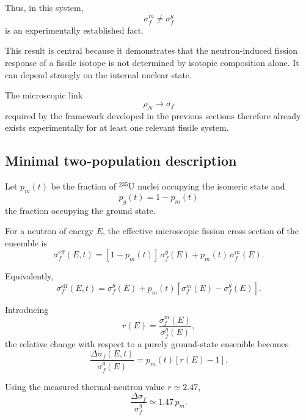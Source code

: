 Thus, in this system,
\begin{equation}
\boxed{\sigma_f^m \neq \sigma_f^g}
\end{equation}
is an experimentally established fact.

This result is central because it demonstrates that the neutron-induced fission response of a fissile isotope is not determined by isotopic composition alone. It can depend strongly on the internal nuclear state.

The microscopic link
\begin{equation}
\rho_N \longrightarrow \sigma_f
\end{equation}
required by the framework developed in the previous sections therefore already exists experimentally for at least one relevant fissile system.

\subsection{Minimal two-population description}

Let $p_m(t)$ be the fraction of $^{235}\mathrm{U}$ nuclei occupying the isomeric state and
\begin{equation}
p_g(t)=1-p_m(t)
\end{equation}
the fraction occupying the ground state.

For a neutron of energy $E$, the effective microscopic fission cross section of the ensemble is
\begin{equation}
\sigma_f^{\mathrm{eff}}(E,t)
=
[1-p_m(t)]\,\sigma_f^g(E)
+
p_m(t)\,\sigma_f^m(E).
\end{equation}

Equivalently,
\begin{equation}
\sigma_f^{\mathrm{eff}}(E,t)
=
\sigma_f^g(E)
+
p_m(t)
\left[
\sigma_f^m(E)-\sigma_f^g(E)
\right].
\end{equation}

Introducing
\begin{equation}
r(E)=\frac{\sigma_f^m(E)}{\sigma_f^g(E)},
\end{equation}
the relative change with respect to a purely ground-state ensemble becomes
\begin{equation}
\frac{\Delta\sigma_f(E,t)}{\sigma_f^g(E)}
=
p_m(t)[r(E)-1].
\end{equation}

Using the measured thermal-neutron value $r\simeq2.47$,
\begin{equation}
\frac{\Delta\sigma_f}{\sigma_f^g}\simeq1.47\,p_m.
\end{equation}

